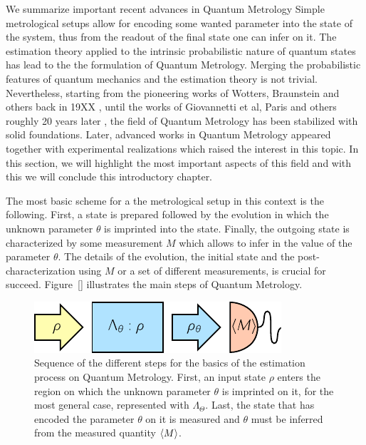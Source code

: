 We summarize important recent advances in Quantum Metrology
Simple metrological setups allow for encoding some wanted parameter into the state of the system, thus from the readout of the final state one can infer on it.
The estimation theory applied to the intrinsic probabilistic nature of quantum states has lead to the the formulation of Quantum Metrology.
Merging the probabilistic features of quantum mechanics and the estimation theory is not trivial.
Nevertheless, starting from the pioneering works of Wotters, Braunstein and others back in 19XX \citep{Wotters, Braunstein}, until the works of Giovannetti et al, Paris and others roughly 20 years later \citep{Giovannetti, Paris2009}, the field of Quantum Metrology has been stabilized with solid foundations.
Later, advanced works in Quantum Metrology appeared \citep{} together with experimental realizations \citep{} which raised the interest in this topic.
In this section, we will highlight the most important aspects of this field and with this we will conclude this introductory chapter.

The most basic scheme for a the metrological setup in this context is the following.
First, a state is prepared followed by the evolution in which the unknown parameter $\theta$ is imprinted into the state.
Finally, the outgoing state is characterized by some measurement $M$ which allows to infer in the value of the parameter $\theta$.
The details of the evolution, the initial state and the post-characterization using $M$ or a set of different measurements, is crucial for succeed.
Figure~\ref{} illustrates the main steps of Quantum Metrology.
\begin{figure}[htp]
  \centering
  \includegraphics[scale=1.2]{img/BG_preparation_encoding_estimation.pdf}
  \caption[Quantum Metrology estimation process]{Sequence of the different steps for the basics of the estimation process on Quantum Metrology. First, an input state $\rho$ enters the region on which the unknown parameter $\theta$ is imprinted on it, for the most general case, represented with $\Lambda_{\Theta}$. Last, the state that has encoded the parameter $\theta$ on it is measured and $\theta$ must be inferred from the measured quantity $\langle M \rangle$.}
  \label{fig:bg-preparation-encoding-estimation}
\end{figure}

